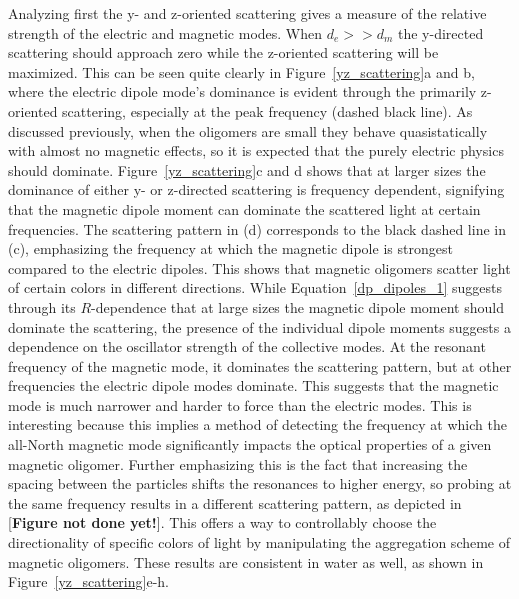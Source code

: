 \documentclass[journal=apchd5,manuscript=article]{achemso}
\begin{document}
Analyzing first the y- and z-oriented scattering gives a measure of the relative strength of the electric and magnetic modes. When $d_e >> d_m$ the y-directed scattering should approach zero while the z-oriented scattering will be maximized. This can be seen quite clearly in Figure~\ref{yz_scattering}a and b, where the electric dipole mode's dominance is evident through the primarily z-oriented scattering, especially at the peak frequency (dashed black line). As discussed previously, when the oligomers are small they behave quasistatically with almost no magnetic effects, so it is expected that the purely electric physics should dominate. Figure~\ref{yz_scattering}c and d shows that at larger sizes the dominance of either y- or z-directed scattering is frequency dependent, signifying that the magnetic dipole moment can dominate the scattered light at certain frequencies. The scattering pattern in (d) corresponds to the black dashed line in (c), emphasizing the frequency at which the magnetic dipole is strongest compared to the electric dipoles. This shows that magnetic oligomers scatter light of certain colors in different directions. While Equation~\ref{dp_dipoles_1} suggests through its $R$-dependence that at large sizes the magnetic dipole moment should dominate the scattering, the presence of the individual dipole moments suggests a dependence on the oscillator strength of the collective modes. At the resonant frequency of the magnetic mode, it dominates the scattering pattern, but at other frequencies the electric dipole modes dominate. This suggests that the magnetic mode is much narrower and harder to force than the electric modes. This is interesting because this implies a method of detecting the frequency at which the all-North magnetic mode significantly impacts the optical properties of a given magnetic oligomer. Further emphasizing this is the fact that increasing the spacing between the particles shifts the resonances to higher energy, so probing at the same frequency results in a different scattering pattern, as depicted in [\textbf{Figure not done yet!}]. This offers a way to controllably choose the directionality of specific colors of light by manipulating the aggregation scheme of magnetic oligomers. These results are consistent in water as well, as shown in Figure~\ref{yz_scattering}e-h.
\end{document}
